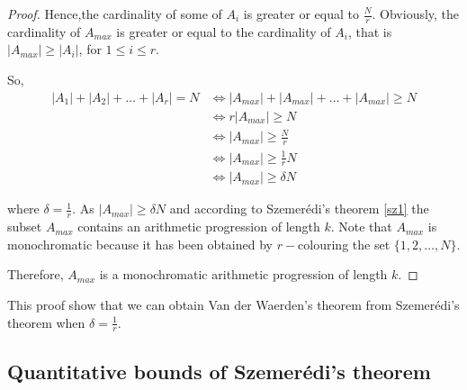 \begin{proof}
Hence,the cardinality of some of $A_i$ is greater or equal to  $\frac{N}{r}.$
%
Obviously, the cardinality of $A_{max}$ is greater or equal to the cardinality of $A_i$, that is $|A_{max}| \geq |A_i|$, for $1\leq i \leq r.$

So,
\begin{align*}
|A_1|+|A_2|+ \ldots +|A_r|=N & \Longleftrightarrow |A_{max}|+|A_{max}|+ \ldots +|A_{max}| \geq N \\  & \Longleftrightarrow r|A_{max}| \geq N \\
& \Longleftrightarrow |A_{max}| \geq \frac{N}{r}\\
&  \Longleftrightarrow |A_{max}| \geq \frac{1}{r} N \\ 
& \Longleftrightarrow |A_{max}| \geq \delta N\end{align*}

where $\delta = \frac{1}{r}$.
As $|A_{max}| \geq \delta N$ and according to Szemerédi's theorem \eqref{sz1} the subset $A_{max}$  contains an arithmetic progression of length $k.$
Note that $A_{max}$ is monochromatic because it has been obtained by $r-$colouring the set $\{1,2,\ldots, N\}.$

Therefore, $A_{max}$ is a monochromatic arithmetic progression of length $k.$
\end{proof}
This proof show that we can obtain Van der Waerden's theorem from   Szemerédi's theorem when $\delta= \frac{1}{r}.$


\subsection{Quantitative bounds of Szemerédi's theorem}

